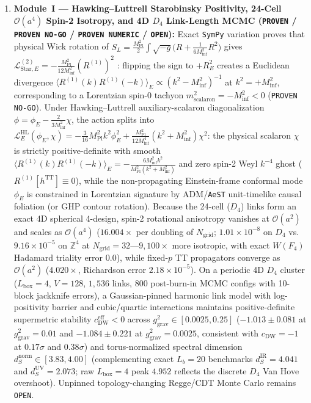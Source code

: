 \documentclass[11pt,a4paper]{article}
\begin{document}
\begin{enumerate}
\item \textbf{Module~I --- Hawking--Luttrell Starobinsky Positivity, 24-Cell $\mathcal{O}(a^4)$ Spin-2 Isotropy, and 4D $D_4$ Link-Length MCMC (\texttt{PROVEN} / \texttt{PROVEN NO-GO} / \texttt{PROVEN NUMERIC} / \texttt{OPEN}):}
Exact \texttt{SymPy} variation proves that physical Wick rotation of $S_L = \frac{M_{\mathrm{Pl}}^2}{2}\int\sqrt{-g}\bigl(R + \frac{1}{6M_{\mathrm{inf}}^2}R^2\bigr)$ gives $\mathcal{L}_{\mathrm{Star},E}^{(2)} = -\frac{M_{\mathrm{Pl}}^2}{12M_{\mathrm{inf}}^2}(R^{(1)})^2$ \cite{HawkingLuttrell1984}: flipping the sign to $+R_E^2$ creates a Euclidean divergence $\langle R^{(1)}(k)R^{(1)}(-k)\rangle_E \propto (k^2 - M_{\mathrm{inf}}^2)^{-1}$ at $k^2 = +M_{\mathrm{inf}}^2$, corresponding to a Lorentzian spin-0 tachyon $m_{\mathrm{scalaron}}^2 = -M_{\mathrm{inf}}^2 < 0$ (\texttt{PROVEN NO-GO}). Under Hawking--Luttrell auxiliary-scalaron diagonalization $\phi = \phi_E - \frac{2}{3M_{\mathrm{inf}}^2}\chi$, the action splits into $\mathcal{L}_E^{\mathrm{HL}}(\phi_E,\chi) = -\frac{3}{16}M_{\mathrm{Pl}}^2 k^2\phi_E^2 + \frac{M_{\mathrm{Pl}}^2}{12M_{\mathrm{inf}}^4}(k^2 + M_{\mathrm{inf}}^2)\chi^2$: the physical scalaron $\chi$ is strictly positive-definite with smooth $\langle R^{(1)}(k)R^{(1)}(-k)\rangle_E = -\frac{6M_{\mathrm{inf}}^2 k^2}{M_{\mathrm{Pl}}^2(k^2 + M_{\mathrm{inf}}^2)}$ and zero spin-2 Weyl $k^{-4}$ ghost ($R^{(1)}[h^{\mathrm{TT}}]\equiv 0$), while the non-propagating Einstein-frame conformal mode $\phi_E$ is constrained in Lorentzian signature by ADM/\texttt{AeST} unit-timelike causal foliation (or GHP contour rotation). Because the 24-cell ($D_4$) links form an exact 4D spherical 4-design, spin-2 rotational anisotropy vanishes at $\mathcal{O}(a^2)$ and scales as $\mathcal{O}(a^4)$ ($16.004\times$ per doubling of $N_{\mathrm{grid}}$; $1.01\times 10^{-8}$ on $D_4$ vs.\ $9.16\times 10^{-5}$ on $\mathbb{Z}^4$ at $N_{\mathrm{grid}}=32$---$9{,}100\times$ more isotropic, with exact $W(F_4)$ Hadamard triality error $0.0$), while fixed-$p$ TT propagators converge as $\mathcal{O}(a^2)$ ($4.020\times$, Richardson error $2.18\times 10^{-5}$). On a periodic 4D $D_4$ cluster ($L_{\mathrm{box}}=4$, $V=128$, $1{,}536$ links, $800$ post-burn-in MCMC configs with 10-block jackknife errors), a Gaussian-pinned harmonic link model with log-positivity barrier and cubic/quartic interactions maintains positive-definite supermetric stability $c_{\mathrm{DW}}^{\mathrm{eff}} < 0$ across $g_{\mathrm{grav}}^2 \in [0.0025, 0.25]$ ($-1.013 \pm 0.081$ at $g_{\mathrm{grav}}^2=0.01$ and $-1.084 \pm 0.221$ at $g_{\mathrm{grav}}^2=0.0025$, consistent with $c_{\mathrm{DW}}=-1$ at $0.17\sigma$ and $0.38\sigma$) and torus-normalized spectral dimension $d_S^{\mathrm{norm}}\in[3.83, 4.00]$ (complementing exact $L_b=20$ benchmarks $d_S^{\mathrm{IR}}=4.041$ and $d_S^{\mathrm{UV}}=2.073$; raw $L_{\mathrm{box}}=4$ peak $4.952$ reflects the discrete $D_4$ Van Hove overshoot). Unpinned topology-changing Regge/CDT Monte Carlo remains \texttt{OPEN}.


\end{enumerate}
\end{document}
